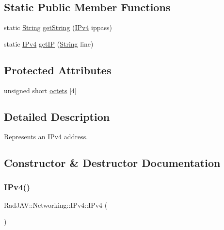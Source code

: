 \subsection*{Static Public Member Functions}
\begin{DoxyCompactItemize}
\item 
static \mbox{\hyperlink{class_rad_j_a_v_1_1_string}{String}} \mbox{\hyperlink{class_rad_j_a_v_1_1_networking_1_1_i_pv4_ae1a87ef33521fe67f22ec3971980eb4e}{get\+String}} (\mbox{\hyperlink{class_rad_j_a_v_1_1_networking_1_1_i_pv4}{I\+Pv4}} ippass)
\item 
static \mbox{\hyperlink{class_rad_j_a_v_1_1_networking_1_1_i_pv4}{I\+Pv4}} \mbox{\hyperlink{class_rad_j_a_v_1_1_networking_1_1_i_pv4_a2d3f283f6256911cbd69404dc204b059}{get\+IP}} (\mbox{\hyperlink{class_rad_j_a_v_1_1_string}{String}} line)
\end{DoxyCompactItemize}
\subsection*{Protected Attributes}
\begin{DoxyCompactItemize}
\item 
unsigned short \mbox{\hyperlink{class_rad_j_a_v_1_1_networking_1_1_i_pv4_afe984ab9f910d7936b42fbb34c428610}{octets}} \mbox{[}4\mbox{]}
\end{DoxyCompactItemize}


\subsection{Detailed Description}
Represents an \mbox{\hyperlink{class_rad_j_a_v_1_1_networking_1_1_i_pv4}{I\+Pv4}} address. 

\subsection{Constructor \& Destructor Documentation}
\mbox{\label{class_rad_j_a_v_1_1_networking_1_1_i_pv4_a5618bbf3d166d86ded140439fec1b82f}} 
\subsubsection{\texorpdfstring{I\+Pv4()}{IPv4()}\hspace{0.1cm}{\footnotesize\ttfamily [1/2]}}
{\footnotesize\ttfamily Rad\+J\+A\+V\+::\+Networking\+::\+I\+Pv4\+::\+I\+Pv4 (\begin{DoxyParamCaption}{ }\end{DoxyParamCaption})}

